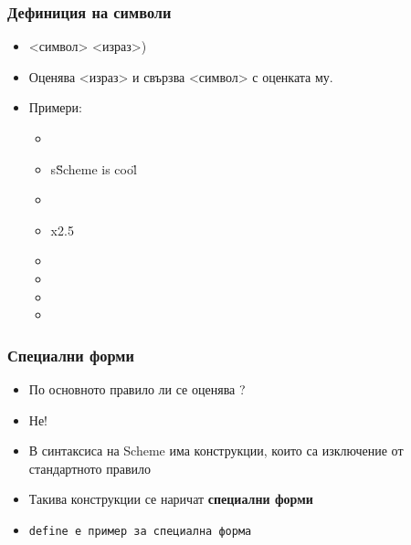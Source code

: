 \documentclass{beamer}
\begin{document}
\begin{frame}
  \frametitle{Дефиниция на символи}

  \begin{itemize}[<+->]
  \item {} <символ> <израз>\tta)
  \item Оценява <израз> и свързва <символ> с оценката му.
  \item Примери:
    \begin{itemize}
    \item {}
    \item \evalsto s{\"Scheme is cool\"}
    \item {}
    \item \evalsto x{2.5}
    \item {}
    \item {}
    \item {}
    \item {}
    \end{itemize}
  \end{itemize}
\end{frame}

\begin{frame}
  \frametitle{Специални форми}

  \begin{itemize}[<+->]
  \item По основното правило ли се оценява ?
  \item \alert{Не!}
  \item В синтаксиса на Scheme има конструкции, които са изключение от стандартното правило
  \item Такива конструкции се наричат \textbf{специални форми}
  \item \tt{define} е пример за специална форма
  \end{itemize}
\end{frame}
\end{document}
